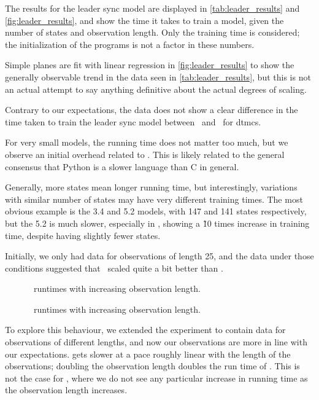 The results for the leader sync model are displayed in \autoref{tab:leader_results} and \autoref{fig:leader_results}, and show the time it takes to train a model, given the number of states and observation length.
Only the training time is considered; the initialization of the programs is not a factor in these numbers.

Simple planes are fit with linear regression in \autoref{fig:leader_results} to show the generally observable trend in the data seen in \autoref{tab:leader_results}, but this is not an actual attempt to say anything definitive about the actual degrees of scaling.

Contrary to our expectations, the data does not show a clear difference in the time taken to train the leader sync model between \Jajapy\ and \Cupaal\ for \glspl{dtmc}.

For very small models, the running time does not matter too much, but we observe an initial overhead related to \Jajapy. This is likely related to the general consensus that Python is a slower language than C in general.

Generally, more states mean longer running time, but interestingly, variations with similar number of states may have very different training times. The most obvious example is the 3.4 and 5.2 models, with 147 and 141 states respectively, but the 5.2 is much slower, especially in \Cupaal, showing a \~10 times increase in training time, despite having slightly fewer states.

Initially, we only had data for observations of length 25, and the data under those conditions suggested that \Jajapy\ scaled quite a bit better than \Cupaal.

\begin{figure}[htb!]
    
    \caption{\Cupaal\ runtimes with increasing observation length.}
    \label{fig:cupaal-length-to-runtime}
\end{figure}


\begin{figure}[htb!]
    
    \caption{\Jajapy\ runtimes with increasing observation length.}
    \label{fig:jajapy-length-to-runtime}
\end{figure}


To explore this behaviour, we extended the experiment to contain data for observations of different lengths, and now our observations are more in line with our expectations.
\Jajapy gets slower at a pace roughly linear with the length of the observations; doubling the observation length doubles the run time of \Jajapy.
This is not the case for \Cupaal, where we do not see any particular increase in running time as the observation length increases.

